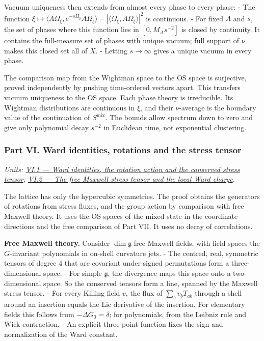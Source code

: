 \documentclass[
  letterpaper,
  11pt]{article}
\begin{document}
Vacuum uniqueness then extends from almost every phase to every phase: -
The function
\(\xi\mapsto\langle A\Omega_\xi,e^{-sH_\xi}A\Omega_\xi\rangle-|\langle\Omega_\xi,A\Omega_\xi\rangle|^2\)
is continuous. - For fixed \(A\) and \(s\), the set of phases where this
function lies in \([0,M_As^{-2}]\) is closed by continuity. It contains
the full-measure set of phases with unique vacuum; full support of
\(\nu\) makes this closed set all of \(X\). - Letting \(s\to\infty\)
gives a unique vacuum in every phase.

The comparison map from the Wightman space to the OS space is
surjective, proved independently by pushing time-ordered vectors apart.
This transfers vacuum uniqueness to the OS space. Each phase theory is
irreducible. Its Wightman distributions are continuous in \(\xi\), and
their \(\nu\)-average is the boundary value of the continuation of
\(S^{\mathrm{mix}}\). The bounds allow spectrum down to zero and give
only polynomial decay \(s^{-2}\) in Euclidean time, not exponential
clustering.

\subsubsection{Part VI. Ward identities, rotations and the stress
tensor}\label{part-vi.-ward-identities-rotations-and-the-stress-tensor}

\emph{Units:
\href{https://github.com/scottnarmstrong/yang-mills-informalization/blob/main/outline/units/VI-1.md}{VI.1
--- Ward identities, the rotation action and the conserved stress
tensor};
\href{https://github.com/scottnarmstrong/yang-mills-informalization/blob/main/outline/units/VI-2.md}{VI.2
--- The free Maxwell stress tensor and the local Ward charge}.}

The lattice has only the hypercubic symmetries. The proof obtains the
generators of rotations from stress fluxes, and the group action by
comparison with free Maxwell theory. It uses the OS spaces of the mixed
state in the coordinate directions and the free comparison of Part VII.
It uses no decay of correlations.

\textbf{Free Maxwell theory.} Consider \(\dim\mathfrak g\) free Maxwell
fields, with field spaces the \(G\)-invariant polynomials in on-shell
curvature jets. - The centred, real, symmetric tensors of degree 4 that
are covariant under signed permutations form a three-dimensional space.
- For simple \(\mathfrak g\), the divergence maps this space onto a
two-dimensional space. So the conserved tensors form a line, spanned by
the Maxwell stress tensor. - For every Killing field \(v\), the flux of
\(\sum_bv_bT_{ab}\) through a shell around an insertion equals the Lie
derivative of the insertion. For elementary fields this follows from
\(-\Delta G_0=\delta\); for polynomials, from the Leibniz rule and Wick
contraction. - An explicit three-point function fixes the sign and
normalization of the Ward constant.
\end{document}
